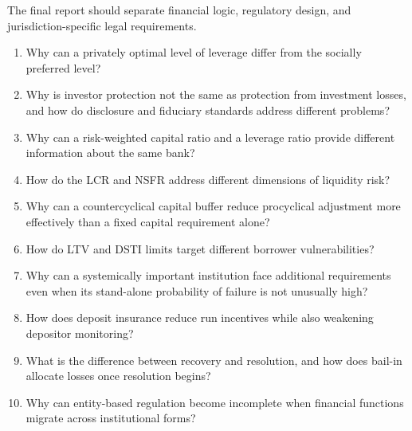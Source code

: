 The final report should separate financial logic, regulatory design, and jurisdiction-specific legal requirements.




\begin{enumerate}

\item Why can a privately optimal level of leverage differ from the socially preferred level?

\item Why is investor protection not the same as protection from investment losses, and how do disclosure and fiduciary standards address different problems?

\item Why can a risk-weighted capital ratio and a leverage ratio provide different information about the same bank?

\item How do the LCR and NSFR address different dimensions of liquidity risk?

\item Why can a countercyclical capital buffer reduce procyclical adjustment more effectively than a fixed capital requirement alone?

\item How do LTV and DSTI limits target different borrower vulnerabilities?

\item Why can a systemically important institution face additional requirements even when its stand-alone probability of failure is not unusually high?

\item How does deposit insurance reduce run incentives while also weakening depositor monitoring?

\item What is the difference between recovery and resolution, and how does bail-in allocate losses once resolution begins?

\item Why can entity-based regulation become incomplete when financial functions migrate across institutional forms?

\end{enumerate}



